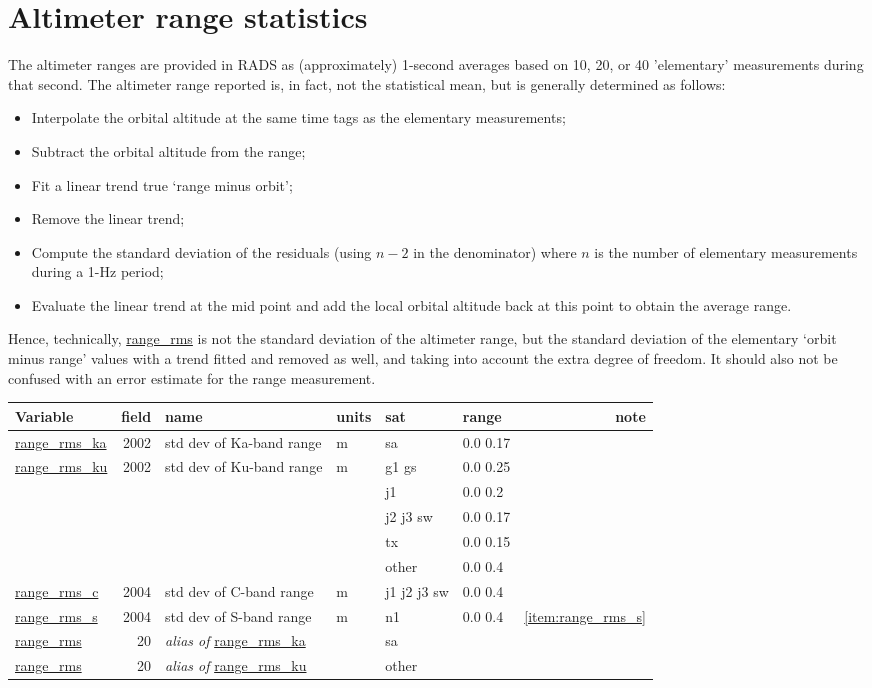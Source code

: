\documentclass[a4paper,11pt,openany,natbib,nomargin]{thesis}
\makeatletter
\newcommand\var[1]{\url{#1}\index{variables!#1@\protect\url{#1}}}
\newcommand\alias[1]{\emph{alias of} \var{#1}}
\newenvironment{vartable}{
\begin{table}[ht]
\small
\begin{tabular}{lrllllr}
\hline
Variable & field & name & units & sat & range & note \\
\hline
}{
\hline
\end{tabular}
\end{table}
}
\makeatother
\begin{document}
\section{Altimeter range statistics}
The altimeter ranges are provided in RADS as (approximately) 1-second averages based on 10, 20, or 40 'elementary' measurements during that second. The altimeter range reported is, in fact, not the statistical mean, but is generally determined as follows:
\begin{itemize}
\item Interpolate the orbital altitude at the same time tags as the elementary measurements;
\item Subtract the orbital altitude from the range;
\item Fit a linear trend true `range minus orbit';
\item Remove the linear trend;
\item Compute the standard deviation of the residuals (using $n-2$ in the denominator) where $n$ is the number of elementary measurements during a 1-Hz period;
\item Evaluate the linear trend at the mid point and add the local orbital altitude back at this point to obtain the average range.
\end{itemize}
Hence, technically, \var{range_rms} is not the standard deviation of the altimeter range, but the standard deviation of the elementary `orbit minus range' values with a trend fitted and removed as well, and taking into account the extra degree of freedom. It should also not be confused with an error estimate for the range measurement.

\begin{vartable}
\var{range_rms_ka} & 2002 & std dev of Ka-band range & m & sa & 0.0 0.17 & \\
\var{range_rms_ku} & 2002 & std dev of Ku-band range & m & g1 gs & 0.0 0.25 & \\
                   &      &                          &   & j1 & 0.0 0.2 & \\
                   &      &                          &   & j2 j3 sw & 0.0 0.17 & \\
                   &      &                          &   & tx & 0.0 0.15 & \\
                   &      &                          &   & other & 0.0 0.4 & \\
\var{range_rms_c}  & 2004 & std dev of C-band range  & m & j1 j2 j3 sw & 0.0 0.4 & \\
\var{range_rms_s}  & 2004 & std dev of S-band range  & m & n1 & 0.0 0.4 & \ref{item:range_rms_s} \\
\hline
\var{range_rms}    &   20 & \alias{range_rms_ka} && sa && \\
\var{range_rms}    &   20 & \alias{range_rms_ku} && other && \\
\end{vartable}
\end{document}
